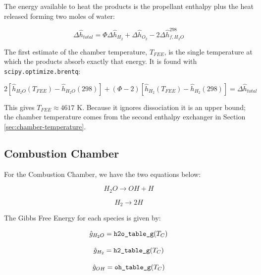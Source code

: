 \documentclass[12pt, Times New Roman]{article}
\begin{document}
    The energy available to heat the products is the propellant enthalpy plus the heat released forming two moles of water:

    \begin{equation}
        \Delta \hat{h}_{total} = \Phi \Delta \hat{h}_{H_{2}} + \Delta \hat{h}_{O_{2}} - 2\Delta \hat{h}^{298}_{f,H_{2}O}
    \end{equation}

    The first estimate of the chamber temperature, $T_{FEE}$, is the single temperature at which the products absorb exactly
    that energy. It is found with \verb|scipy.optimize.brentq|:

    \begin{equation}
        2\left[\hat{h}_{H_{2}O}(T_{FEE}) - \hat{h}_{H_{2}O}(298)\right] + (\Phi-2)\left[\hat{h}_{H_{2}}(T_{FEE}) - \hat{h}_{H_{2}}(298)\right] = \Delta \hat{h}_{total}
    \end{equation}

    This gives $T_{FEE} \approx 4617$ K. Because it ignores dissociation it is an upper bound; the chamber temperature
    comes from the second enthalpy exchanger in Section \ref{sec:chamber-temperature}.

    \vspace*{6pt}

    \subsection{Combustion Chamber}
    For the Combustion Chamber, we have the two equations below:

    \begin{equation}
        H_{2}O \rightarrow OH + H 
    \end{equation}

    \begin{equation}
        H_{2} \rightarrow 2H
    \end{equation}

    The Gibbs Free Energy for each species is given by:
    
    \begin{equation}
        \hat{g}_{H_{2}O} = \verb|h2o_table_g|(T_{C})
    \end{equation}

    \begin{equation}
        \hat{g}_{H_{2}} = \verb|h2_table_g|(T_{C})
    \end{equation}

    \begin{equation}
        \hat{g}_{OH} = \verb|oh_table_g|(T_{C})
    \end{equation}
\end{document}
